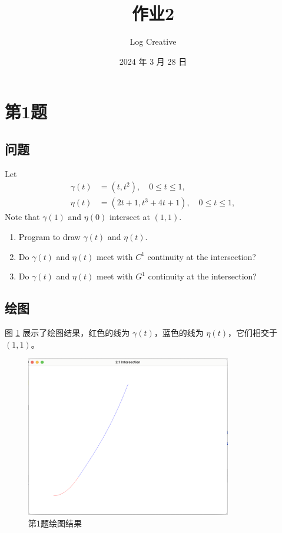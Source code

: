 \documentclass[math-font=newcm]{sjtuarticle}
\title{作业2}
\author{Log Creative}
\date{2024 年 3 月 28 日}
\begin{document}
\maketitle

\tableofcontents*
\clearpage

\section{第1题}

\subsection{问题}
Let
\begin{align*}
    \gamma(t)&=(t,t^2),\quad 0\leq t\leq 1,\\
    \eta(t)&=(2t+1,t^3+4t+1),\quad 0\leq t\leq 1,
\end{align*}
Note that $\gamma(1)$ and $\eta(0)$ intersect at $(1,1)$.
\begin{enumerate}
    \item Program to draw $\gamma(t)$ and $\eta(t)$.
    \item Do $\gamma(t)$ and $\eta(t)$ meet with $C^1$ continuity at the intersection?
    \item Do $\gamma(t)$ and $\eta(t)$ meet with $G^1$ continuity at the intersection?
\end{enumerate}

\subsection{绘图}

图 \ref{fig:p1} 展示了绘图结果，红色的线为 $\gamma(t)$，蓝色的线为 $\eta(t)$，它们相交于 $(1,1)$。

\begin{figure}[h]
    \centering
    \includegraphics[width=0.8\textwidth]{p1.png}
    \caption{第1题绘图结果}
    \label{fig:p1}
\end{figure}
\end{document}
